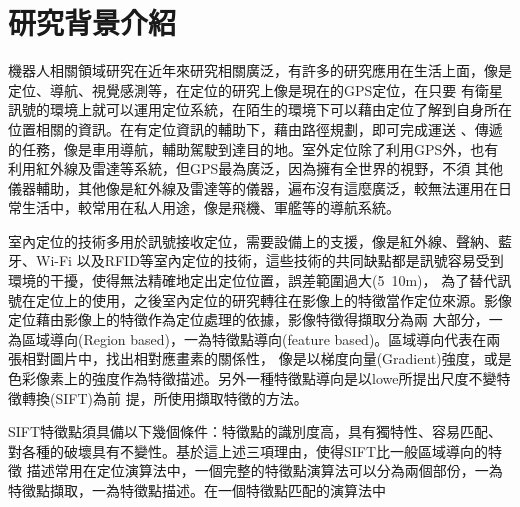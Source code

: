 \section{研究背景介紹}
	機器人相關領域研究在近年來研究相關廣泛，有許多的研究應用在生活上面，像是定位、導航、視覺感測等，在定位的研究上像是現在的GPS定位，在只要
有衛星訊號的環境上就可以運用定位系統，在陌生的環境下可以藉由定位了解到自身所在位置相關的資訊。在有定位資訊的輔助下，藉由路徑規劃，即可完成運送
、傳遞的任務，像是車用導航，輔助駕駛到達目的地。室外定位除了利用GPS外，也有利用紅外線及雷達等系統，但GPS最為廣泛，因為擁有全世界的視野，不須
其他儀器輔助，其他像是紅外線及雷達等的儀器，遍布沒有這麼廣泛，較無法運用在日常生活中，較常用在私人用途，像是飛機、軍艦等的導航系統。

	室內定位的技術多用於訊號接收定位，需要設備上的支援，像是紅外線、聲納\cite{Bekkerman2006}、藍牙、Wi-Fi\cite{Chin-HengLim2007}
以及RFID\cite{Zhou2009}等室內定位的技術，這些技術的共同缺點都是訊號容易受到環境的干擾，使得無法精確地定出定位位置，誤差範圍過大(5~10m)，
為了替代訊號在定位上的使用，之後室內定位的研究轉往在影像上的特徵當作定位來源。影像定位藉由影像上的特徵作為定位處理的依據，影像特徵得擷取分為兩
大部分，一為區域導向(Region based)，一為特徵點導向(feature based)\cite{Zitová03}。區域導向代表在兩張相對圖片中，找出相對應畫素的關係性，
像是以梯度向量(Gradient)強度，或是色彩像素上的強度作為特徵描述。另外一種特徵點導向是以lowe\cite{Lowe2004}所提出尺度不變特徵轉換(SIFT)為前
提，所使用擷取特徵的方法。

	SIFT特徵點須具備以下幾個條件：特徵點的識別度高，具有獨特性、容易匹配、對各種的破壞具有不變性。基於這上述三項理由，使得SIFT比一般區域導向的特徵
描述常用在定位演算法中，一個完整的特徵點演算法可以分為兩個部份，一為特徵點擷取，一為特徵點描述。在一個特徵點匹配的演算法中
	
	

